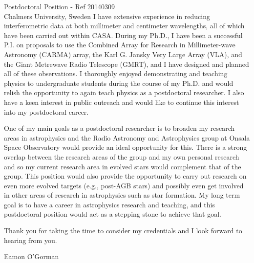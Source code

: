 \documentclass[10pt]{letter} %
\begin{document}
\begin{letter}{Postdoctoral Position - Ref 20140309\\
Chalmers University, Sweden
}
\noindent I have extensive experience in reducing interferometric data at both millimeter and centimeter wavelengths, all of which have been carried out within CASA. During my Ph.D., I have been a successful P.I. on proposals to use the Combined Array for Research in Millimeter-wave Astronomy (CARMA) array, the Karl G. Jansky Very Large Array (VLA), and the Giant Metrewave Radio Telescope (GMRT), and I have designed and planned all of these observations. I thoroughly enjoyed demonstrating and teaching physics to undergraduate students during the course of my Ph.D. and would relish the opportunity to again teach physics as a postdoctoral researcher. I also have a keen interest in public outreach and would like to continue this interest into my postdoctoral career.

\noindent One of my main goals as a postdoctoral researcher is to broaden my research areas in astrophysics and the Radio Astronomy and Astrophysics group at Onsala Space Observatory would provide an ideal opportunity for this. There is a strong overlap between the research areas of the group and my own personal research and so my current research area in evolved stars would complement that of the group. This position would also provide the opportunity to carry out research on even more evolved targets (e.g., post-AGB stars) and possibly even get involved in other areas of research in astrophysics such as star formation. My long term goal is to have a career in astrophysics research and teaching, and this postdoctoral position would act as a stepping stone to achieve that goal.

Thank you for taking the time to consider my credentials and I look forward to hearing from you.

Eamon O'Gorman
\\
\\
\\
\\
\\
\\
\\
\\
\end{letter}
 
\end{document}
